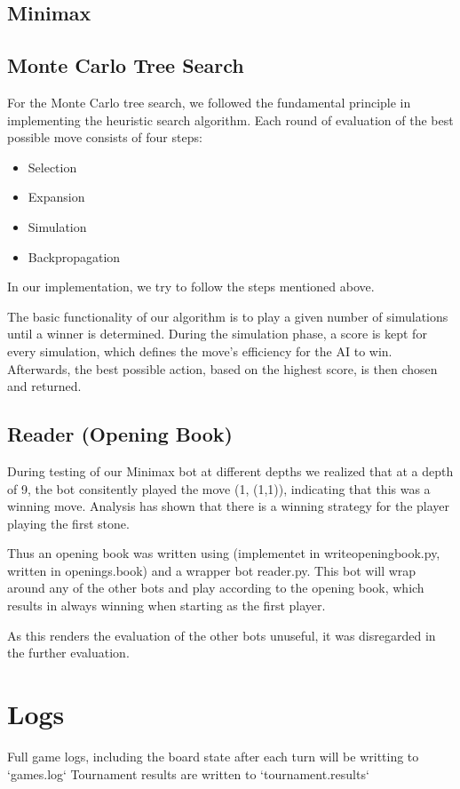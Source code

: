\subsection{Minimax}

\subsection{Monte Carlo Tree Search}
For the Monte Carlo tree search, we followed the fundamental principle in implementing the heuristic search algorithm. Each round of evaluation of the best possible move consists of four steps:
\begin{itemize}
    \item Selection
    \item Expansion
    \item Simulation
    \item Backpropagation
\end{itemize}
In our implementation, we try to follow the steps mentioned above.

The basic functionality of our algorithm is to play a given number of simulations until a winner is determined. During the simulation phase, a score is kept for every simulation, which defines the move's efficiency for the AI to win. Afterwards, the best possible action, based on the highest score, is then chosen and returned.

\subsection{Reader (Opening Book)}

During testing of our Minimax bot at different depths we realized that at
a depth of 9, the bot consitently played the move (1, (1,1)), indicating that
this was a winning move. Analysis has shown that there is a winning strategy
for the player playing the first stone.

Thus an opening book was written using (implementet in writeopeningbook.py,
written in openings.book) and a wrapper bot reader.py. This bot will wrap around
any of the other bots and play according to the opening book, which results
in always winning when starting as the first player.

As this renders the evaluation of the other bots unuseful, it was disregarded in
the further evaluation.

\section{Logs}
Full game logs, including the board state after each turn will be writting to `games.log`
Tournament results are written to `tournament.results`
